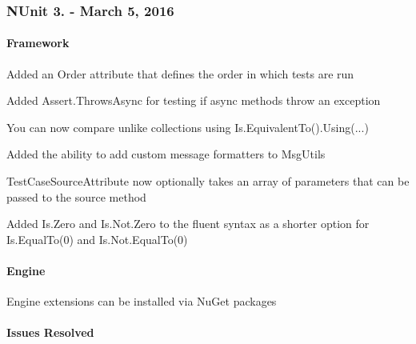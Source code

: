 \subsubsection*{N\+Unit 3. -\/ March 5, 2016}

\paragraph*{Framework}


\begin{DoxyItemize}
\item Added an Order attribute that defines the order in which tests are run
\item Added Assert.\+Throws\+Async for testing if async methods throw an exception
\item You can now compare unlike collections using Is.\+Equivalent\+To().Using(...)
\item Added the ability to add custom message formatters to Msg\+Utils
\item Test\+Case\+Source\+Attribute now optionally takes an array of parameters that can be passed to the source method
\item Added Is.\+Zero and Is.\+Not.\+Zero to the fluent syntax as a shorter option for Is.\+Equal\+To(0) and Is.\+Not.\+Equal\+To(0)
\end{DoxyItemize}

\paragraph*{Engine}


\begin{DoxyItemize}
\item Engine extensions can be installed via Nu\+Get packages
\end{DoxyItemize}

\paragraph*{Issues Resolved}


